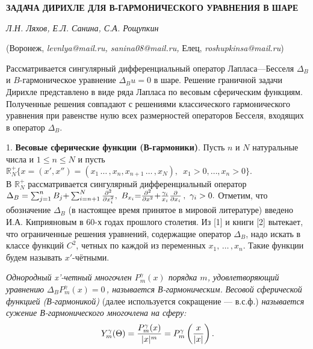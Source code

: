 \begin{center}
    {\bf  ЗАДАЧА ДИРИХЛЕ ДЛЯ В-ГАРМОНИЧЕСКОГО УРАВНЕНИЯ В ШАРЕ}

    {\it Л.Н. Ляхов, Е.Л. Санина, С.А. Рощупкин}

    (Воронеж,  {\it levnlya@mail.ru, sanina08@mail.ru,} Елец, {\it roshupkinsa@mail.ru})
\end{center}




Рассматривается сингулярный дифференциальный оператор Лапласа---Бесселя $\Delta_B$ и $B$-гармоническое уравнение $\Delta_B u=0$ в шаре. Решение граничной задачи Дирихле представлено в виде ряда Лапласа по весовым сферическим функциям. Полученные решения совпадают с решениями классического гармонического уравнения при равенстве нулю всех размерностей операторов Бесселя, входящих в оператор $\Delta_B$.





  1. {\bf Весовые сферические функции (В-гармоники)}.
Пусть $n$ и $N$ натуральные числа и  $1{\le}n{\le}N$ и пусть\\
$\mathbb{R}^+_N \{x{=}(x',x'')
{=}(x_1\,\ldots\,,x_n,x_{n+1}\,\ldots\,,x_N),\,\,\, x_1{>}0,\ldots,x_n{>}0\}.$ \\
 В $\mathbb{R}_N^+$ рассматривается сингулярный
дифференциальный оператор
$\Delta_B=\sum_{j=1}^nB_j{+}\sum_{i=n+1}^N{\partial^2\over\partial x_i^2},
\,\, B_{x_i}{=}{{\partial^2}\over {\partial x^2}}{+}{\gamma_i\over {x_i}}
{\partial\over{\partial x_i}}\,,\,\, \gamma_i>0.$ Отметим, что обозначение $\Delta_B$ (в настоящее время принятое в мировой литературе)  введено И.А. Киприяновым в 60-х годах прошлого столетия. Из [1] %
и книги [2]
вытекает, что ограниченные решения уравнений, содержащие оператор $\Delta_B$, надо искать в классе функций $C^2$, четных по каждой из переменных $x_1,\,\ldots\,,x_n$. Такие функции будем называть $x'$-чётными.


{\it Однородный x'-четный многочлен $P_m^\gamma(x)$ порядка $m$,   удовлетворяющий
уравнению $ \Delta_BP_m^\gamma(x)= 0$\,, называется В-гармоничес\-ким.}
{\it Весовой сферической функцией (В-гармоникой)} (далее используется сок\-ра\-ще\-ние --- в.с.ф.)
{\it называется сужение В-гармонического многочлена на сферу:}
$$Y_m^\gamma(\Theta)={P_m^\gamma(x)\over|x|^m}= P_m^\gamma\left(x\over|x|
\right).$$

